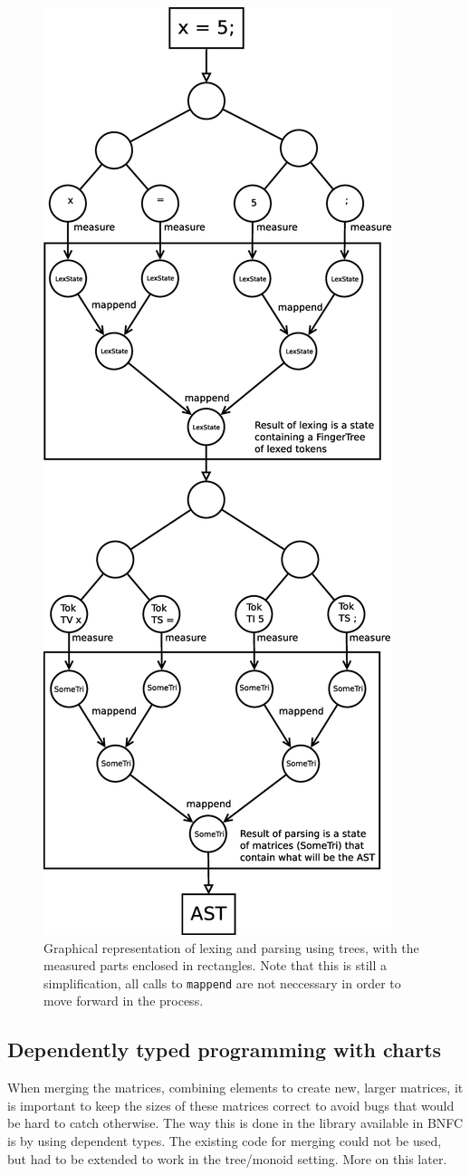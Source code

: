 \documentclass[a4paper,12pt,twosided]{report}
\begin{document}
\begin{figure}[H]
\centering
\includegraphics[width=.5\textwidth]{tree.eps}
\caption{\label{treemeasure}Graphical representation of lexing and parsing using
trees, with the measured parts enclosed in rectangles. Note that this is still a
simplification, all calls to \texttt{mappend} are not neccessary in order to
move forward in the process.}
\end{figure}

\subsection{Dependently typed programming with charts}
When merging the matrices, combining elements to create new, larger matrices, it
is important to keep the sizes of these matrices correct to avoid bugs that
would be hard to catch otherwise. The way this is done in the library available
in BNFC is by using dependent types. The existing code for merging could not be
used, but had to be extended to work in the tree/monoid setting. More on this
later.
\end{document}
